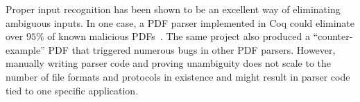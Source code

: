 Proper input recognition has been shown to be an excellent way of eliminating ambiguous inputs. In
one case, a PDF parser implemented in Coq could eliminate over $95\%$ of known malicious
PDFs~\cite{Bogk-PDF}. The same project also produced a ``counter-example'' PDF that triggered
numerous bugs in other PDF parsers. However, manually writing parser code and proving unambiguity
does not scale to the number of file formats and protocols in existence and might result in parser
code tied to one specific application.



